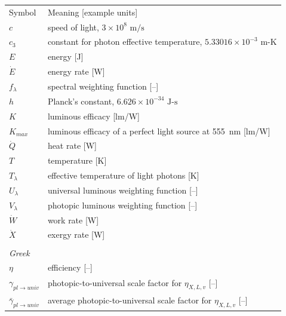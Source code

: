 \documentclass[energies,article,accept,moreauthors,pdftex]{Definitions/mdpi}\usepackage[]{graphicx}\usepackage[]{color}
\newcommand{\gammarat}{\gamma_{pl\rightarrow{}univ}}
\newcommand{\gammaratavg}{\bar{\gamma}_{pl\rightarrow{}univ}}
\begin{document}

\vspace{6pt}
 \noindent
\begin{tabular}{ll}
Symbol & Meaning [example units] \\ 
%
%
%
  $c$ & speed of light, $3 \times 10^8 \text{ m/s}$ \\
  $c_3$ & constant for photon effective temperature, $5.33016 \times 10^{-3} \text{ m-K}$ \\
  $E$ & energy [J] \\
  $\dot{E}$ & energy rate [W] \\
  $f_\lambda$ & spectral weighting function [--] \\
  $h$ & Planck's constant, $6.626 \times 10^{-34} \text{ J-s}$ \\
  $K$ & luminous efficacy [lm/W] \\
  $K_{max}$ & luminous efficacy of a perfect light source at 555~nm [lm/W] \\
  $\dot{Q}$ & heat rate [W] \\
  $T$ & temperature [K] \\
  $T_\lambda$ & effective temperature of light photons [K] \\
  $U_\lambda$ & universal luminous weighting function [--] \\
  $V_\lambda$ & photopic luminous weighting function [--] \\
  $\dot{W}$ & work rate [W] \\
  $\dot{X}$ & exergy rate [W] \\
%
\\
\multicolumn{2}{l}{\emph{Greek}} \\ 
%
  $\eta$ & efficiency [--] \\
  $\gammarat$ & photopic-to-universal scale factor for $\eta_{X,L,v}$ [--] \\
  $\gammaratavg$ & average photopic-to-universal scale factor for $\eta_{X,L,v}$ [--] \\

\end{tabular}
\end{document}
